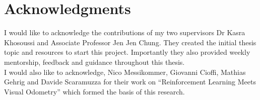 




\clearpage
\section*{Acknowledgments}

I would like to acknowledge the contributions of my two supervisors Dr Kasra Khosoussi and Associate Professor Jen Jen Chung. They created the initial thesis topic and resources to start this project. Importantly they also provided weekly mentorship, feedback and guidance throughout this thesis.\\

\noindent
I would also like to acknowledge, Nico Messikommer, Giovanni Cioffi, Mathias Gehrig and Davide Scaramuzza for their work on “Reinforcement Learning Meets Visual Odometry” which formed the basis of this research.






\clearpage


    
    
